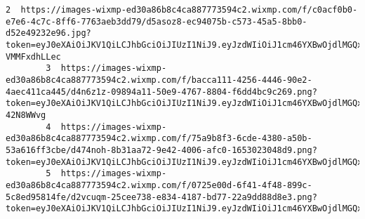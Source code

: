 \documentclass[11pt]{article}
\begin{document}
\begin{Verbatim}[commandchars=\\\{\}]
        2  https://images-wixmp-ed30a86b8c4ca887773594c2.wixmp.com/f/c0acf0b0-e7e6-4c7c-8ff6-7763aeb3dd79/d5asoz8-ec94075b-c573-45a5-8bb0-d52e49232e96.jpg?token=eyJ0eXAiOiJKV1QiLCJhbGciOiJIUzI1NiJ9.eyJzdWIiOiJ1cm46YXBwOjdlMGQxODg5ODIyNjQzNzNhNWYwZDQxNWVhMGQyNmUwIiwiaXNzIjoidXJuOmFwcDo3ZTBkMTg4OTgyMjY0MzczYTVmMGQ0MTVlYTBkMjZlMCIsIm9iaiI6W1t7InBhdGgiOiJcL2ZcL2MwYWNmMGIwLWU3ZTYtNGM3Yy04ZmY2LTc3NjNhZWIzZGQ3OVwvZDVhc296OC1lYzk0MDc1Yi1jNTczLTQ1YTUtOGJiMC1kNTJlNDkyMzJlOTYuanBnIn1dXSwiYXVkIjpbInVybjpzZXJ2aWNlOmZpbGUuZG93bmxvYWQiXX0.raEwrdO3gYAzPWV0BaonYhXWzcC3pAm-VMMFxdhLLec                                                                                                                                                                   
        3  https://images-wixmp-ed30a86b8c4ca887773594c2.wixmp.com/f/bacca111-4256-4446-90e2-4aec411ca445/d4n6z1z-09894a11-50e9-4767-8804-f6dd4bc9c269.png?token=eyJ0eXAiOiJKV1QiLCJhbGciOiJIUzI1NiJ9.eyJzdWIiOiJ1cm46YXBwOjdlMGQxODg5ODIyNjQzNzNhNWYwZDQxNWVhMGQyNmUwIiwiaXNzIjoidXJuOmFwcDo3ZTBkMTg4OTgyMjY0MzczYTVmMGQ0MTVlYTBkMjZlMCIsIm9iaiI6W1t7InBhdGgiOiJcL2ZcL2JhY2NhMTExLTQyNTYtNDQ0Ni05MGUyLTRhZWM0MTFjYTQ0NVwvZDRuNnoxei0wOTg5NGExMS01MGU5LTQ3NjctODgwNC1mNmRkNGJjOWMyNjkucG5nIn1dXSwiYXVkIjpbInVybjpzZXJ2aWNlOmZpbGUuZG93bmxvYWQiXX0.fKxTuklGbcGlYbIM0S\_AAkRVp9MDet\_yMD-42N8WWvg                                                                                                                                                                   
        4  https://images-wixmp-ed30a86b8c4ca887773594c2.wixmp.com/f/75a9b8f3-6cde-4380-a50b-53a616ff3cbe/d474noh-8b31aa72-9e42-4006-afc0-1653023048d9.png?token=eyJ0eXAiOiJKV1QiLCJhbGciOiJIUzI1NiJ9.eyJzdWIiOiJ1cm46YXBwOjdlMGQxODg5ODIyNjQzNzNhNWYwZDQxNWVhMGQyNmUwIiwiaXNzIjoidXJuOmFwcDo3ZTBkMTg4OTgyMjY0MzczYTVmMGQ0MTVlYTBkMjZlMCIsIm9iaiI6W1t7InBhdGgiOiJcL2ZcLzc1YTliOGYzLTZjZGUtNDM4MC1hNTBiLTUzYTYxNmZmM2NiZVwvZDQ3NG5vaC04YjMxYWE3Mi05ZTQyLTQwMDYtYWZjMC0xNjUzMDIzMDQ4ZDkucG5nIn1dXSwiYXVkIjpbInVybjpzZXJ2aWNlOmZpbGUuZG93bmxvYWQiXX0.MN8jGrrVbhVG6B5zmQsmyWaGcxPYSTDA7xIItuUn8Ig                                                                                                                                                                   
        5  https://images-wixmp-ed30a86b8c4ca887773594c2.wixmp.com/f/0725e00d-6f41-4f48-899c-5c8ed95814fe/d2vcuqm-25cee738-e834-4187-bd77-22a9dd88d8e3.png?token=eyJ0eXAiOiJKV1QiLCJhbGciOiJIUzI1NiJ9.eyJzdWIiOiJ1cm46YXBwOjdlMGQxODg5ODIyNjQzNzNhNWYwZDQxNWVhMGQyNmUwIiwiaXNzIjoidXJuOmFwcDo3ZTBkMTg4OTgyMjY0MzczYTVmMGQ0MTVlYTBkMjZlMCIsIm9iaiI6W1t7InBhdGgiOiJcL2ZcLzA3MjVlMDBkLTZmNDEtNGY0OC04OTljLTVjOGVkOTU4MTRmZVwvZDJ2Y3VxbS0yNWNlZTczOC1lODM0LTQxODctYmQ3Ny0yMmE5ZGQ4OGQ4ZTMucG5nIn1dXSwiYXVkIjpbInVybjpzZXJ2aWNlOmZpbGUuZG93bmxvYWQiXX0.OtN6CRHb7viL9pMiMrg0GvW4PCf3WxIyFp\_6gmhxHx4                                                                                                                                                                   

\end{Verbatim}
\end{document}
